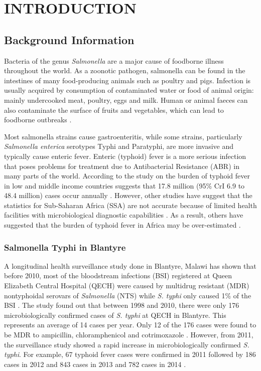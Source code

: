 
\chapter{INTRODUCTION}

\section{Background Information}

Bacteria of the genus \textit{Salmonella} are a major cause of foodborne illness throughout the world. As a zoonotic pathogen, salmonella can be found in the intestines of many food-producing animals such as poultry and pigs. Infection is usually acquired by consumption of contaminated water or food of animal origin: mainly undercooked meat, poultry, eggs and milk. Human or animal faeces can also contaminate the surface of fruits and vegetables, which can lead to foodborne outbreaks \citep{Who:2014}.

Most salmonella strains cause gastroenteritis, while some strains, particularly \textit{Salmonella enterica} serotypes Typhi and Paratyphi, are more invasive and typically cause enteric fever. Enteric (typhoid) fever is a more serious infection that poses problems for treatment due to Antibacterial Resistance (ABR) in many parts of the world. According to the study on the burden of typhoid fever in low and middle income countries suggests that 17.8 million (95\% CrI 6.9 to 48.4 million) cases occur annually \citep{Antillon:2017}. However, other studies have suggest that the statistics for Sub-Saharan Africa (SSA) are not accurate because of limited health facilities with microbiological diagnostic capabilities \citep{Peters:2004}. As a result, others have suggested that the burden of typhoid fever in Africa may be over-estimated \citep{Mweu:2008}.

\restoregeometry

\subsection{Salmonella Typhi in Blantyre}

A longitudinal health surveillance study done in Blantyre, Malawi has shown that before 2010, most of the bloodstream infections (BSI) registered at Queen Elizabeth Central Hospital (QECH) were caused by multidrug resistant (MDR) nontyphoidal serovars of \textit{Salmonella} (NTS) while \textit{S. typhi} only caused 1\% of the BSI \citep{Gordon:2008, Musicha:2017, Feasey:2015}. The study found out that between 1998 and 2010, there were only 176 microbiologically confirmed cases of \textit{S. typhi} at QECH in Blantyre. This represents an average of 14 cases per year. Only 12 of the 176 cases were found to be MDR to ampicillin, chloramphenicol and cotrimoxazole \citep{Feasey:2015}. However, from 2011, the surveillance study showed a rapid increase in microbiologically confirmed \textit{S. typhi}. For example, 67 typhoid fever cases were confirmed in 2011 followed by 186 cases in 2012 and 843 cases in 2013 and 782 cases in 2014 \citep{Feasey:2015}.

